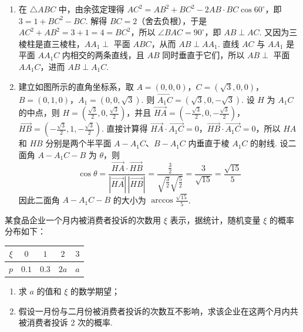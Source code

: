 \begin{solution}
\begin{enumerate}
\item 在 \(\triangle ABC\) 中，由余弦定理得 \(AC^{2}=AB^{2}+BC^{2}-2AB\cdot BC\cos60^{\circ}\)，即 \(3=1+BC^{2}-BC\). 解得 \(BC=2\)（舍去负根），于是 \(AC^{2}+AB^{2}=3+1=4=BC^{2}\)，所以 \(\angle BAC=90^{\circ}\)，即 \(AB\perp AC\). 又因为三棱柱是直三棱柱，\(AA_{1}\perp\) 平面 \(ABC\)，从而 \(AB\perp AA_{1}\). 直线 \(AC\) 与 \(AA_{1}\) 是平面 \(AA_{1}C\) 内相交的两条直线，且 \(AB\) 同时垂直于它们，所以 \(AB\perp\) 平面 \(AA_{1}C\)，进而 \(AB\perp A_{1}C\).
\item 建立如图所示的直角坐标系，取 \(A=\left(0,0,0\right)\)，\(C=\left(\sqrt{3},0,0\right)\)，\(B=\left(0,1,0\right)\)，\(A_{1}=\left(0,0,\sqrt{3}\right)\). 则 \(\overrightarrow{A_{1}C}=\left(\sqrt{3},0,-\sqrt{3}\right)\). 设 \(H\) 为 \(A_{1}C\) 的中点，则 \(H=\left(\frac{\sqrt{3}}{2},0,\frac{\sqrt{3}}{2}\right)\)，并且 \(\overrightarrow{HA}=\left(-\frac{\sqrt{3}}{2},0,-\frac{\sqrt{3}}{2}\right)\)，\(\overrightarrow{HB}=\left(-\frac{\sqrt{3}}{2},1,-\frac{\sqrt{3}}{2}\right)\). 直接计算得 \(\overrightarrow{HA}\cdot\overrightarrow{A_{1}C}=0\)，\(\overrightarrow{HB}\cdot\overrightarrow{A_{1}C}=0\)，所以 \(HA\) 和 \(HB\) 分别是两个半平面 \(A-A_{1}C\)、\(B-A_{1}C\) 内垂直于棱 \(A_{1}C\) 的射线. 设二面角 \(A-A_{1}C-B\) 为 \(\theta\)，则
\[
\cos\theta=\frac{\overrightarrow{HA}\cdot\overrightarrow{HB}}{|\overrightarrow{HA}|\,|\overrightarrow{HB}|}=\frac{\frac{3}{2}}{\sqrt{\frac{3}{2}}\sqrt{\frac{5}{2}}}=\frac{3}{\sqrt{15}}=\frac{\sqrt{15}}{5}
\]
因此二面角 \(A-A_{1}C-B\) 的大小为 \(\arccos\frac{\sqrt{15}}{5}\).
\end{enumerate}
\end{solution}

\begin{problem}
某食品企业一个月内被消费者投诉的次数用 \(\xi\) 表示，据统计，随机变量 \(\xi\) 的概率分布如下：

\begin{center}
\begin{tabular}{|c|c|c|c|c|}
\hline
\(\xi\) & \(0\) & \(1\) & \(2\) & \(3\) \\
\hline
\(p\) & \(0.1\) & \(0.3\) & \(2a\) & \(a\) \\
\hline
\end{tabular}
\end{center}

\begin{enumerate}
\item 求 \(a\) 的值和 \(\xi\) 的数学期望；
\item 假设一月份与二月份被消费者投诉的次数互不影响，求该企业在这两个月内共被消费者投诉 2 次的概率.
\end{enumerate}
\end{problem}

